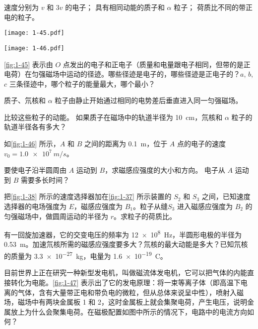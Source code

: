 \begin{Exercise}
\begin{question}
  \begin{tasks}
    \task 速度分别为 $v$ 和 $3v$ 的电子；
    \task 具有相同动能的质子和 $\alpha$ 粒子；
    \task 荷质比不同的带正电的粒子。
  \end{tasks}
  \begin{figurehere}
    \begin{minipage}[b]{0.48\linewidth}\centering
      \texttt{[image: 1-45.pdf]}
      \caption{}\label{fig:1-45}
    \end{minipage}
    \begin{minipage}[b]{0.48\linewidth}\centering
      \texttt{[image: 1-46.pdf]}
      \caption{}\label{fig:1-46}
    \end{minipage}
  \end{figurehere}
  \item \cref{fig:1-45} 表示由 $O$ 点发出的电子和正电子（质量和电量跟电子相同，但带的是正电荷）在匀强磁场中运动的径迹。哪些径迹是电子的，哪些径迹是正电子的？$a$, $b$, $c$ 三条径迹中，哪个粒子的能量最大，哪个最小？
  \item 质子、氘核和 $\alpha$ 粒子由静止开始通过相同的电势差后垂直进入同一匀强磁场。
  \begin{tasks}
    \task 比较这些粒子的动能。
    \task 如果质子在磁场中的轨道半径为 \qty{10}{cm}，氘核和 $\alpha$ 粒子的轨道半径各有多大？
  \end{tasks}
  \item 如\cref{fig:1-46} 所示，$A$ 和 $B$ 之间的距离为 \qty{0.1}{m}，位于 $A$ 点的电子的速度 $v_0=\qty{1.0e7}{m/s}$。
  \begin{tasks}
    \task 要使电子沿半圆周由 $A$ 运动到 $B$，求磁感应强度的大小和方向。
    \task 电子从 $A$ 运动到 $B$ 需要多长时间？
  \end{tasks}
  \item 把\cref{fig:1-38} 所示的速度选择器加在\cref{fig:1-37} 所示装置的 $S_2$ 和 $S_3$ 之间，已知速度选择器的电场强度为 $E$，磁感应强度为 $B_1$。粒子从缝$S_3$ 进入磁感应强度为 $B_2$ 的匀强磁场中，做圆周运动的半径为 $r$。求粒子的荷质比。
  \item 有一回旋加速器，它的交变电压的频率为 \qty{12e8}{Hz}，半圆形电极的半径为 \qty{0.53}{m}。加速氘核所需的磁感应强度要多大？氘核的最大动能是多大？已知氘核的质量为 \qty{3.3e-27}{kg}，电量为 \qty{1.6e-19}{C}。
  \item 目前世界上正在研究一种新型发电机，叫做磁流体发电机，它可以把气体的内能直接转化为电能。\cref{fig:1-47} 表示出了它的发电原理：将一束等离子体（即高温下电离的气体，含有大量带正电和带负电的微粒，但从总体来说呈中性），喷射入磁场，磁场中有两块金属板 1 和 2，这时金属板上就会集聚电荷，产生电压，说明金属放上为什么会聚集电荷。在磁极配置如图中所示的情况下，电路中的电流方向如何？


\end{question}
\end{Exercise}

